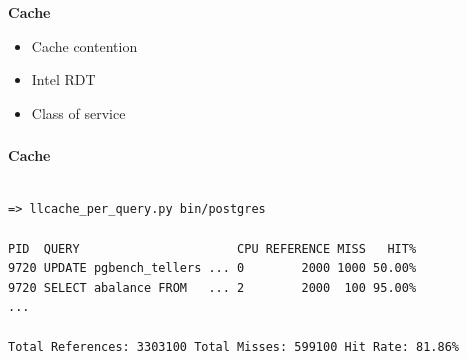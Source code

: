 \documentclass[usenames,dvipsnames, 18pt, compress, aspectratio=169]{beamer}
\begin{document}
\begin{frame}[fragile]{}
    \frametitle{}
    \begin{center}
        \textbf{Cache}

        \begin{itemize}[]
            \item Cache contention
            \item Intel RDT
            \item Class of service
        \end{itemize}

    \end{center}
\end{frame}

\begin{frame}[fragile]{}
    \frametitle{}
    \begin{center}
        \textbf{Cache}

        \begin{flushleft}
		\begin{verbatim}

=> llcache_per_query.py bin/postgres

PID  QUERY                      CPU REFERENCE MISS   HIT%
9720 UPDATE pgbench_tellers ... 0        2000 1000 50.00%
9720 SELECT abalance FROM   ... 2        2000  100 95.00%
...

Total References: 3303100 Total Misses: 599100 Hit Rate: 81.86%
        \end{verbatim}
        \end{flushleft}

    \end{center}
\end{frame}

\begin{frame}[fragile]{}
    \frametitle{}
    \begin{center}


    \end{center}
\end{frame}
\end{document}
